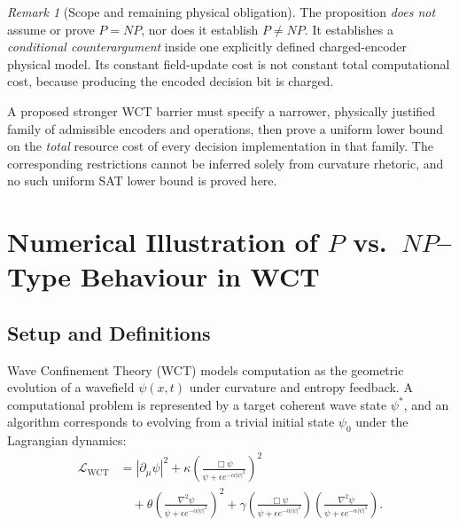 \documentclass[12pt]{article}
\theoremstyle{remark}
\newtheorem*{remark}{Remark}
\begin{document}
\begin{remark}[Scope and remaining physical obligation]
The proposition \emph{does not} assume or prove $P=NP$, nor does it
establish $P\ne NP$. It establishes a \emph{conditional counterargument}
inside one explicitly defined charged-encoder physical model.
Its constant field-update cost is not constant total computational
cost, because producing the encoded decision bit is charged.

A proposed stronger WCT barrier must specify a narrower,
physically justified family of admissible encoders and operations,
then prove a uniform lower bound on the \emph{total} resource cost of
every decision implementation in that family. The corresponding
restrictions cannot be inferred solely from curvature rhetoric, and
no such uniform SAT lower bound is proved here.
\end{remark}


\clearpage
\section{Numerical Illustration of $P$ vs.\ $NP$--Type Behaviour in WCT}
\label{sec:numerical-pvnp}

\subsection{Setup and Definitions}

Wave Confinement Theory (WCT) models computation as the geometric evolution of a
wavefield \( \psi(x,t) \) under curvature and entropy feedback. A computational
problem is represented by a target coherent wave state \( \psi^* \), and an
algorithm corresponds to evolving from a trivial initial state \( \psi_0 \)
under the Lagrangian dynamics:
\begin{equation}
\begin{aligned}
\mathcal{L}_{\text{WCT}} &= |\partial_\mu \psi|^2
+ \kappa \left( \frac{\Box \psi}{\psi + \epsilon e^{-\alpha|\psi|^2}} \right)^2 \\
&\quad + \theta \left( \frac{\nabla^2 \psi}{\psi + \epsilon e^{-\alpha|\psi|^2}} \right)^2
+ \gamma \left( \frac{\Box \psi}{\psi + \epsilon e^{-\alpha|\psi|^2}} \right)
        \left( \frac{\nabla^2 \psi}{\psi + \epsilon e^{-\alpha|\psi|^2}} \right).
\end{aligned}
\end{equation}
\end{document}

